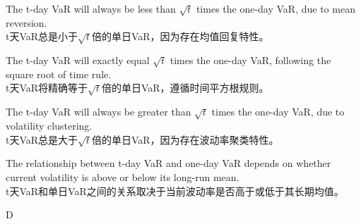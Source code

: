 \documentclass{article}
\begin{document}
\begin{choices}
    \item The t-day VaR will always be less than \(\sqrt{t}\) times the one-day VaR, due to mean reversion.\\
    t天VaR总是小于\(\sqrt{t}\)倍的单日VaR，因为存在均值回复特性。
    
    \item The t-day VaR will exactly equal \(\sqrt{t}\) times the one-day VaR, following the square root of time rule.\\
    t天VaR将精确等于\(\sqrt{t}\)倍的单日VaR，遵循时间平方根规则。
    
    \item The t-day VaR will always be greater than \(\sqrt{t}\) times the one-day VaR, due to volatility clustering.\\
    t天VaR总是大于\(\sqrt{t}\)倍的单日VaR，因为存在波动率聚类特性。
    
    \item The relationship between t-day VaR and one-day VaR depends on whether current volatility is above or below its long-run mean.\\
    t天VaR和单日VaR之间的关系取决于当前波动率是否高于或低于其长期均值。
\end{choices}

\begin{correctanswer}
    D
\end{correctanswer}
\end{document}
